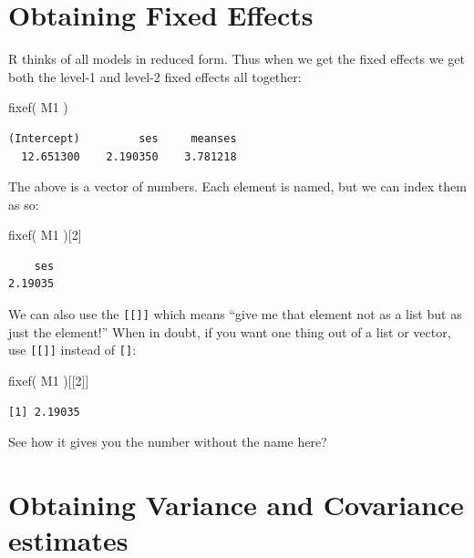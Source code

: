 \documentclass[
  letterpaper,
  DIV=11,
  numbers=noendperiod]{scrreprt}
\newenvironment{Shaded}{\begin{snugshade}}{\end{snugshade}}
\newcommand{\DecValTok}[1]{\textcolor[rgb]{0.25,0.63,0.44}{#1}}
\newcommand{\FunctionTok}[1]{\textcolor[rgb]{0.02,0.16,0.49}{#1}}
\newcommand{\NormalTok}[1]{\textcolor[rgb]{0.00,0.44,0.13}{#1}}
\begin{document}
\hypertarget{obtaining-fixed-effects-1}{%
\section{Obtaining Fixed Effects}\label{obtaining-fixed-effects-1}}

R thinks of all models in reduced form. Thus when we get the fixed
effects we get both the level-1 and level-2 fixed effects all together:

\begin{Shaded}
\begin{Highlighting}[]
\FunctionTok{fixef}\NormalTok{( M1 )}
\end{Highlighting}
\end{Shaded}

\begin{verbatim}
(Intercept)         ses     meanses 
  12.651300    2.190350    3.781218 
\end{verbatim}

The above is a vector of numbers. Each element is named, but we can
index them as so:

\begin{Shaded}
\begin{Highlighting}[]
\FunctionTok{fixef}\NormalTok{( M1 )[}\DecValTok{2}\NormalTok{]}
\end{Highlighting}
\end{Shaded}

\begin{verbatim}
    ses 
2.19035 
\end{verbatim}

We can also use the \texttt{{[}{[}{]}{]}} which means ``give me that
element not as a list but as just the element!'' When in doubt, if you
want one thing out of a list or vector, use \texttt{{[}{[}{]}{]}}
instead of \texttt{{[}{]}}:

\begin{Shaded}
\begin{Highlighting}[]
\FunctionTok{fixef}\NormalTok{( M1 )[[}\DecValTok{2}\NormalTok{]]}
\end{Highlighting}
\end{Shaded}

\begin{verbatim}
[1] 2.19035
\end{verbatim}

See how it gives you the number without the name here?

\hypertarget{obtaining-variance-and-covariance-estimates}{%
\section{Obtaining Variance and Covariance
estimates}\label{obtaining-variance-and-covariance-estimates}}
\end{document}
